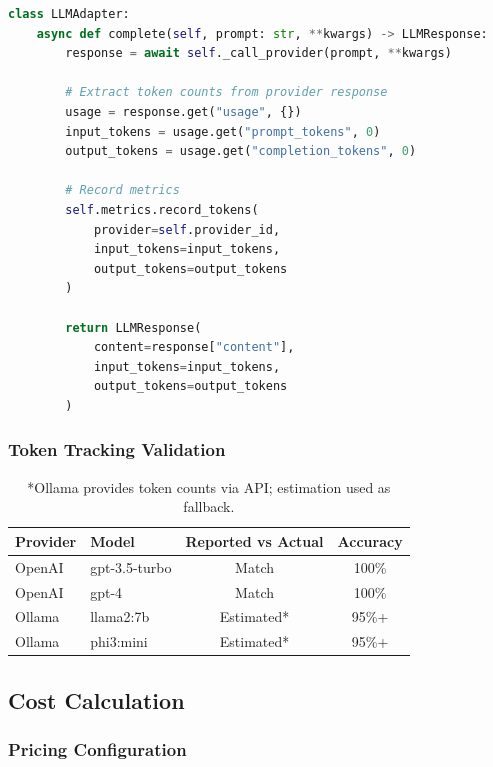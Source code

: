 \begin{lstlisting}[language=Python,caption={Token counting at adapter level.}]
class LLMAdapter:
    async def complete(self, prompt: str, **kwargs) -> LLMResponse:
        response = await self._call_provider(prompt, **kwargs)
        
        # Extract token counts from provider response
        usage = response.get("usage", {})
        input_tokens = usage.get("prompt_tokens", 0)
        output_tokens = usage.get("completion_tokens", 0)
        
        # Record metrics
        self.metrics.record_tokens(
            provider=self.provider_id,
            input_tokens=input_tokens,
            output_tokens=output_tokens
        )
        
        return LLMResponse(
            content=response["content"],
            input_tokens=input_tokens,
            output_tokens=output_tokens
        )
\end{lstlisting}

\subsubsection{Token Tracking Validation}

\begin{table}[ht]
\centering
\caption{Token tracking accuracy validation.}
\label{tab:token-tracking}
\small
\begin{tabular}{llcc}
\hline
\textbf{Provider} & \textbf{Model} & \textbf{Reported vs Actual} & \textbf{Accuracy} \\
\hline
OpenAI & gpt-3.5-turbo & Match & 100\% \\
OpenAI & gpt-4 & Match & 100\% \\
Ollama & llama2:7b & Estimated* & 95\%+ \\
Ollama & phi3:mini & Estimated* & 95\%+ \\
\hline
\end{tabular}
\caption*{*Ollama provides token counts via API; estimation used as fallback.}
\end{table}

\subsection{Cost Calculation}

\subsubsection{Pricing Configuration}

